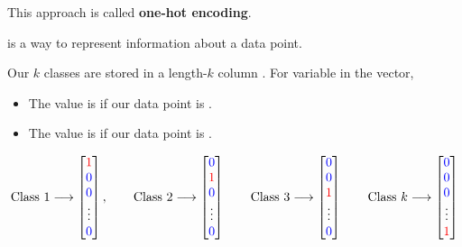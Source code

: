             This approach is called \textbf{one-hot encoding}.\\
            
            \begin{definition}
                 is a way to represent  information about a data point.
                
                Our $k$ classes are stored in a length-$k$ column . For  variable in the vector, 
                
                \begin{itemize}
                    \item The value is  if our data point is .
                    \item The value is  if our data point is .
                \end{itemize}

                 \begin{equation*}
                    \text{Class 1} \longrightarrow
                    \begin{bmatrix}
                    \textcolor{red}{1} \\ \textcolor{blue}{0} \\ \textcolor{blue}{0} \\ \vdots \\ \textcolor{blue}{0}
                    \end{bmatrix},
                    \qquad
                    \text{Class 2} \longrightarrow
                    \begin{bmatrix}
                    \textcolor{blue}{0} \\ \textcolor{red}{1} \\ \textcolor{blue}{0} \\ \vdots \\ \textcolor{blue}{0}
                    \end{bmatrix}
                    \qquad
                    \text{Class 3} \longrightarrow
                    \begin{bmatrix}
                    \textcolor{blue}{0} \\ \textcolor{blue}{0} \\ \textcolor{red}{1} \\ \vdots \\ \textcolor{blue}{0}
                    \end{bmatrix}
                    \qquad
                    \text{Class } k \longrightarrow
                    \begin{bmatrix}
                    \textcolor{blue}{0} \\ \textcolor{blue}{0} \\ \textcolor{blue}{0} \\ \vdots \\ \textcolor{red}{1}
                    \end{bmatrix}
                \end{equation*}
                

\end{definition}
